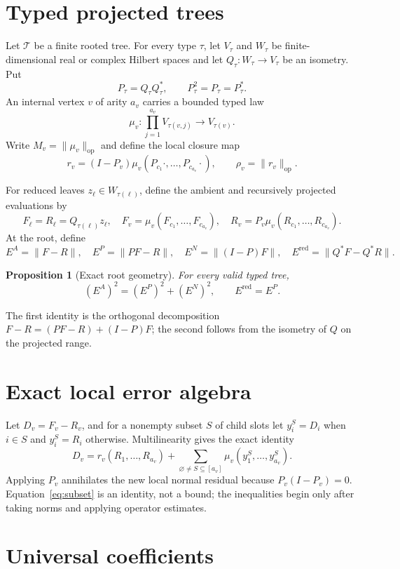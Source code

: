 \documentclass[11pt]{amsart}
\newtheorem{proposition}[theorem]{Proposition}
\theoremstyle{definition}
\theoremstyle{remark}
\newcommand{\op}{\mathrm{op}}
\newcommand{\norm}[1]{\lVert#1\rVert}
\begin{document}
\section{Typed projected trees}

Let $\mathcal T$ be a finite rooted tree. For every type $\tau$, let $V_\tau$
and $W_\tau$ be finite-dimensional real or complex Hilbert spaces and let
$Q_\tau:W_\tau\to V_\tau$ be an isometry. Put
\[
 P_\tau=Q_\tau Q_\tau^*,\qquad P_\tau^2=P_\tau=P_\tau^*.
\]
An internal vertex $v$ of arity $a_v$ carries a bounded typed law
\[
 \mu_v:\prod_{j=1}^{a_v}V_{\tau(v,j)}\longrightarrow V_{\tau(v)}.
\]
Write $M_v=\norm{\mu_v}_\op$ and define the local closure map
\[
 r_v=(I-P_v)\mu_v(P_{c_1}\cdot,\ldots,P_{c_{a_v}}\cdot),
 \qquad \rho_v=\norm{r_v}_\op.
\]

For reduced leaves $z_\ell\in W_{\tau(\ell)}$, define the ambient and
recursively projected evaluations by
\[
 F_\ell=R_\ell=Q_{\tau(\ell)}z_\ell,\quad
 F_v=\mu_v(F_{c_1},\ldots,F_{c_{a_v}}),\quad
 R_v=P_v\mu_v(R_{c_1},\ldots,R_{c_{a_v}}).
\]
At the root, define
\[
 E^A=\norm{F-R},\quad E^P=\norm{PF-R},\quad
 E^N=\norm{(I-P)F},\quad E^{\mathrm{red}}=\norm{Q^*F-Q^*R}.
\]

\begin{proposition}[Exact root geometry]
For every valid typed tree,
\[
 (E^A)^2=(E^P)^2+(E^N)^2,
 \qquad E^{\mathrm{red}}=E^P.
\]
\end{proposition}

The first identity is the orthogonal decomposition
$F-R=(PF-R)+(I-P)F$; the second follows from the isometry of $Q$ on the
projected range.

\section{Exact local error algebra}

Let $D_v=F_v-R_v$, and for a nonempty subset $S$ of child slots let
$y_i^S=D_i$ when $i\in S$ and $y_i^S=R_i$ otherwise. Multilinearity gives
the exact identity
\begin{equation}
 D_v=r_v(R_1,\ldots,R_{a_v})+
 \sum_{\varnothing\ne S\subseteq[a_v]}\mu_v(y_1^S,\ldots,y_{a_v}^S).
 \label{eq:subset}
\end{equation}
Applying $P_v$ annihilates the new local normal residual because
$P_v(I-P_v)=0$. Equation~\eqref{eq:subset} is an identity, not a bound; the
inequalities begin only after taking norms and applying operator estimates.

\section{Universal coefficients}
\end{document}
